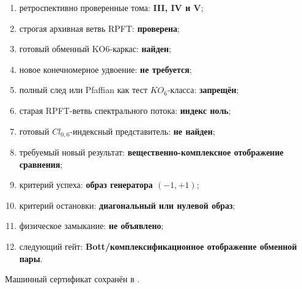 \begin{protocol}
\begin{enumerate}
 \item ретроспективно проверенные тома: \textbf{III, IV и V};
 \item строгая архивная ветвь RPFT: \textbf{проверена};
 \item готовый обменный KO6-каркас: \textbf{найден};
 \item новое конечномерное удвоение: \textbf{не требуется};
 \item полный след или Pfaffian как тест $KO_6$-класса:
 \textbf{запрещён};
 \item старая RPFT-ветвь спектрального потока: \textbf{индекс ноль};
 \item готовый $Cl_{0,6}$-индексный представитель: \textbf{не найден};
 \item требуемый новый результат:
 \textbf{вещественно-комплексное отображение сравнения};
 \item критерий успеха: \textbf{образ генератора $(-1,+1)$};
 \item критерий остановки: \textbf{диагональный или нулевой образ};
 \item физическое замыкание: \textbf{не объявлено};
 \item следующий гейт:
 \textbf{Bott/комплексификационное отображение обменной пары}.
\end{enumerate}
\end{protocol}

Машинный сертификат сохранён в
.